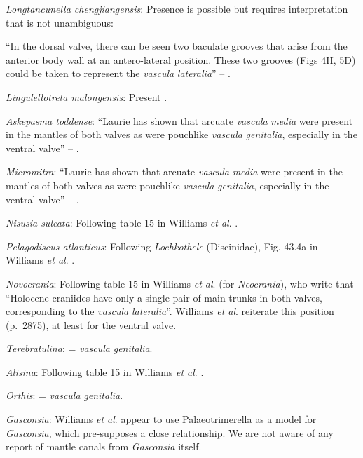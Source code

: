 \documentclass[]{book}
\theoremstyle{definition}
\theoremstyle{definition}
\theoremstyle{definition}
\theoremstyle{remark}
\begin{document}
\emph{Longtancunella chengjiangensis}: Presence is possible but requires
interpretation that is not unambiguous:

``In the dorsal valve, there can be seen two baculate grooves that arise
from the\\
anterior body wall at an antero-lateral position. These two grooves
(Figs 4H, 5D) could be taken to represent the \emph{vascula}
\emph{lateralia}'' -- \citet{Zhang2007Agregarious}.

\emph{Lingulellotreta malongensis}: Present
\citep{Williams2000BrachiopodaLinguliformea}.

\emph{Askepasma toddense}: ``Laurie
\citeyearpar{Laurie1987Themusculature} has shown that arcuate
\emph{vascula} \emph{media} were present in the mantles of both valves
as were pouchlike \emph{vascula} \emph{genitalia}, especially in the
ventral valve'' -- \citet{Williams1997BrachiopodaRevised}.

\emph{Micromitra}: ``Laurie \citeyearpar{Laurie1987Themusculature} has
shown that arcuate \emph{vascula} \emph{media} were present in the
mantles of both valves as were pouchlike \emph{vascula}
\emph{genitalia}, especially in the ventral valve'' --
\citet{Williams1997BrachiopodaRevised}.

\emph{Nisusia sulcata}: Following table 15 in Williams \emph{et al}.
\citeyearpar{Williams2000BrachiopodaLinguliformea}.

\emph{Pelagodiscus atlanticus}: Following \emph{Lochkothele}
(Discinidae), Fig. 43.4a in Williams \emph{et al}.
\citeyearpar{Williams2000BrachiopodaLinguliformea}.

\emph{Novocrania}: Following table 15 in Williams \emph{et al}.
\citeyearpar{Williams2000BrachiopodaLinguliformea} (for
\emph{Neocrania}), who write that ``Holocene craniides have only a
single pair of main trunks in both valves, corresponding to the
\emph{vascula} \emph{lateralia}''. Williams \emph{et al}.
\citeyearpar{Williams2007PartH} reiterate this position (p.~2875), at
least for the ventral valve.

\emph{Terebratulina}: = \emph{vascula} \emph{genitalia}.

\emph{Alisina}: Following table 15 in Williams \emph{et al}.
\citeyearpar{Williams2000BrachiopodaLinguliformea}.

\emph{Orthis}: = \emph{vascula} \emph{genitalia}.

\emph{Gasconsia}: Williams \emph{et al}. \citeyearpar[table
15]{Williams2000BrachiopodaLinguliformea} appear to use Palaeotrimerella
\citep[as drawn in][]{Williams1997BrachiopodaRevised} as a model for
\emph{Gasconsia}, which pre-supposes a close relationship. We are not
aware of any report of mantle canals from \emph{Gasconsia} itself.
\end{document}
